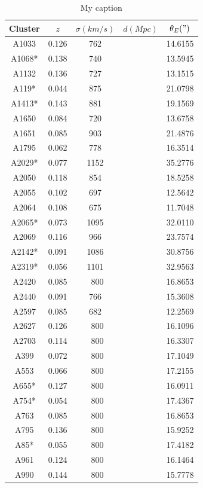 \begin{table}[]
\centering

\begin{tabular}{ccccc}
Cluster & $z$   & $\sigma(km/s)$ & $d(Mpc)$ & $\theta_{E}(")$ \\ \hline \hline
A1033   & 0.126 & 762            &  & 14.6155  \\
A1068*  & 0.138 & 740            &  & 13.5945  \\
A1132   & 0.136 & 727            &  & 13.1515   \\
A119*   & 0.044 & 875            &  & 21.0798   \\
A1413*  & 0.143 & 881            &  & 19.1569   \\
A1650   & 0.084 & 720            &  & 13.6758   \\
A1651   & 0.085 & 903            &  & 21.4876   \\
A1795   & 0.062 & 778            &  & 16.3514   \\
A2029*  & 0.077 & 1152           &  & 35.2776   \\
A2050   & 0.118 & 854            &  & 18.5258   \\
A2055   & 0.102 & 697            &  & 12.5642   \\
A2064   & 0.108 & 675            &  & 11.7048   \\
A2065*  & 0.073 & 1095           &  & 32.0110   \\
A2069   & 0.116 & 966            &  & 23.7574   \\
A2142*  & 0.091 & 1086           &  & 30.8756   \\
A2319*  & 0.056 & 1101           &  & 32.9563   \\
A2420   & 0.085 & ~800           &  & 16.8653   \\
A2440   & 0.091 & 766            &  & 15.3608   \\
A2597   & 0.085 & 682            &  & 12.2569   \\
A2627   & 0.126 & ~800           &  & 16.1096   \\
A2703   & 0.114 & ~800           &  & 16.3307   \\
A399    & 0.072 & ~800           &  & 17.1049   \\
A553    & 0.066 & ~800           &  & 17.2155   \\
A655*   & 0.127 & ~800           &  & 16.0911   \\
A754*   & 0.054 & ~800           &  & 17.4367   \\
A763    & 0.085 & ~800           &  & 16.8653   \\
A795    & 0.136 & ~800           &  & 15.9252   \\
A85*    & 0.055 & ~800           &  & 17.4182   \\
A961    & 0.124 & ~800           &  & 16.1464   \\
A990    & 0.144 & ~800           &  & 15.7778   
\end{tabular}
\caption{My caption}
\label{my-label}
\end{table}

